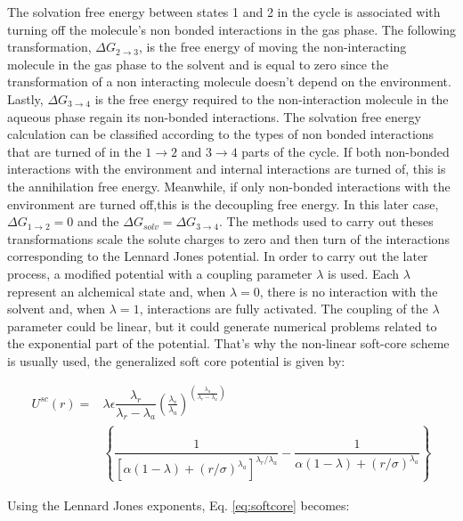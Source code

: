 The solvation free energy between states 1 and 2 in the cycle is associated with turning off the molecule's non bonded interactions in the gas phase. The following transformation, $\Delta G_{2 \rightarrow 3}$, is the free energy of moving the non-interacting molecule in the gas phase to the solvent and is equal to zero since the transformation of a non interacting molecule doesn't depend on the environment. Lastly, $\Delta G_{3 \rightarrow 4}$ is the free energy required to the non-interaction molecule in the aqueous phase regain its non-bonded interactions.  The solvation free energy calculation can be classified according to the types of non bonded interactions that are turned of in the $1 \rightarrow 2$ and $ 3 \rightarrow 4$ parts of the cycle. If both non-bonded interactions with the environment and internal interactions are turned of, this is the annihilation free energy. Meanwhile, if only non-bonded interactions with the environment are turned off,this is the decoupling free energy. In this later case, $\Delta G_{1 \rightarrow 2} = 0$ and the $\Delta G_{solv} = \Delta G_{3 \rightarrow 4} $. The methods used to carry out theses transformations scale the solute charges to zero and then turn of the interactions corresponding to the Lennard Jones potential. In order to carry out the later process, a modified potential with a coupling parameter $\lambda$ is used. Each $\lambda$ represent an alchemical state and, when $\lambda=0$, there is no interaction with the solvent and, when $\lambda=1$, interactions are fully activated. The coupling of the $\lambda$ parameter could be linear, but it could generate numerical problems related to the exponential part of the potential. That's why the non-linear soft-core scheme \cite{beutler1994} is usually used, the generalized soft core potential is given by:

\begin{equation}
\label{eq:softcore}
\begin{aligned}
U^{sc}(r) {}=& \lambda\epsilon\dfrac{\lambda_r}{\lambda_r - \lambda_a} \left(\frac{\lambda_r}{\lambda_a} \right)^{\left( \frac{\lambda_a}{\lambda_r - \lambda_a} \right)} \\
& \left\lbrace\dfrac{1}{\left[\alpha(1-\lambda)+ (r/\sigma)^{\lambda_a}\right]^{\lambda_{r}/\lambda_{a}}} - \dfrac{1}{\alpha(1-\lambda)+(r/\sigma)^{\lambda_a}}\right\rbrace
\end{aligned}
\end{equation}

Using the Lennard Jones exponents, Eq. \eqref{eq:softcore} becomes:


